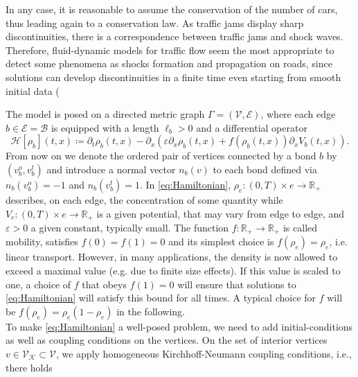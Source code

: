 In any case, it is reasonable to assume the conservation of the number of cars, thus leading again to a conservation law. As traffic jams display sharp discontinuities, there is a correspondence between traffic jams and shock waves. Therefore, fluid-dynamic models for traffic flow seem the most appropriate to detect some phenomena as shocks formation and propagation on roads, since solutions can develop discontinuities in a finite time even starting from smooth initial data (




The model is posed on a directed metric graph $\Gamma = (\mathcal{V}, \mathcal{E})$, where each edge $b \in \mathcal{E} = \mathcal{B}$ is equipped with a length $\ell_b > 0$ and a differential operator
\begin{equation} 
    \label{eq:Hamiltonian}
    \mathcal{H} [\rho_b] (t,x) \coloneqq \partial_t \rho_b (t,x)  - \partial_x (\varepsilon \partial_x \rho_b (t,x) + f(\rho_b (t,x) ) \partial_x V_b (t,x)).
\end{equation}
From now on we denote the ordered pair of vertices connected by a bond $b$ by $(v^{o}_b, v^{t}_b)$ and introduce a normal vector $n_b(v)$ to each bond defined via $n_b(v^{o}_b) = -1$ and $n_b(v^{t}_b) = 1$. In \cref{eq:Hamiltonian}, $\rho_e \colon (0,T) \times e \to \mathbb{R}_{+}$ describes, on each edge, the concentration of some quantity while $V_e \colon (0,T) \times e \to \mathbb{R}_{+}$ is a given potential, that may vary from edge to edge, and $\varepsilon > 0$ a given constant, typically small. The function $f \colon \mathbb{R}_{+} \to \mathbb{R}_{+}$ is called mobility, satisfies $f(0) = f(1) = 0$ and its simplest choice is $f(\rho_e) = \rho_e$, i.e. linear transport. However, in many applications, the density is now allowed to exceed a maximal value (e.g. due to finite size effects). If this value is scaled to one, a choice of $f$ that obeys $f(1) = 0$ will ensure that solutions to \eqref{eq:Hamiltonian} will satisfy this bound for all times. A typical choice for $f$ will be $f(\rho_e) = \rho_e(1-\rho_e)$ in the following. \\
To make \cref{eq:Hamiltonian} a well-posed problem, we need to add initial-conditions as well as coupling conditions on the vertices. On the set of interior vertices $v \in \mathcal{V}_\mathcal{K} \subset \mathcal{V}$, we apply homogeneous Kirchhoff-Neumann coupling conditions, i.e., there holds

